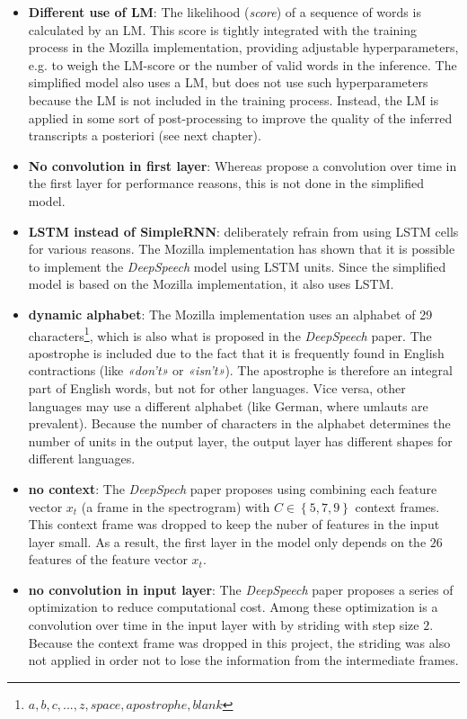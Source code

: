 \begin{itemize}
	\item \textbf{Different use of LM}: The likelihood (\textit{score}) of a sequence of words is calculated by an \ac{LM}. This score is tightly integrated with the training process in the Mozilla implementation, providing adjustable hyperparameters, e.g. to weigh the \ac{LM}-score or the number of valid words in the inference. The simplified model also uses a \ac{LM}, but does not use such hyperparameters because the \ac{LM} is not included in the training process. Instead, the \ac{LM} is applied in some sort of post-processing to improve the quality of the inferred transcripts a posteriori (see next chapter).
	\item \textbf{No convolution in first layer}: Whereas \cite{ctc_paper} propose a convolution over time in the first layer for performance reasons, this is not done in the simplified model.
	\item \textbf{LSTM instead of SimpleRNN}: \cite{ctc_paper} deliberately refrain from using \ac{LSTM} cells for various reasons. The Mozilla implementation has shown that it is possible to implement the \textit{DeepSpeech} model using \ac{LSTM} units. Since the simplified model is based on the Mozilla implementation, it also uses \ac{LSTM}.
	\item \textbf{dynamic alphabet}: The Mozilla implementation uses an alphabet of 29 characters\footnote{${a,b,c,...,z, space, apostrophe, blank}$}, which is also what is proposed in the \textit{DeepSpeech} paper. The apostrophe is included due to the fact that it is frequently found in English contractions (like \textit{«don't»} or \textit{«isn't»}). The apostrophe is therefore an integral part of English words, but not for other languages. Vice versa, other languages may use a different alphabet (like German, where umlauts are prevalent). Because the number of characters in the alphabet determines the number of units in the output layer, the output layer has different shapes for different languages.
	\item \textbf{no context}: The \textit{DeepSpech} paper proposes using combining each feature vector $x_t$ (a frame in the spectrogram) with $C \in \left\{ 5,7,9 \right\}$ context frames. This context frame was dropped to keep the nuber of features in the input layer small. As a result, the first layer in the model only depends on the $26$ features of the feature vector $x_t$.
	\item \textbf{no convolution in input layer}: The \textit{DeepSpeech} paper proposes a series of optimization to reduce computational cost. Among these optimization is a convolution over time in the input layer with by striding with step size $2$. Because the context frame was dropped in this project, the striding was also not applied in order not to lose the information from the intermediate frames.
\end{itemize}

